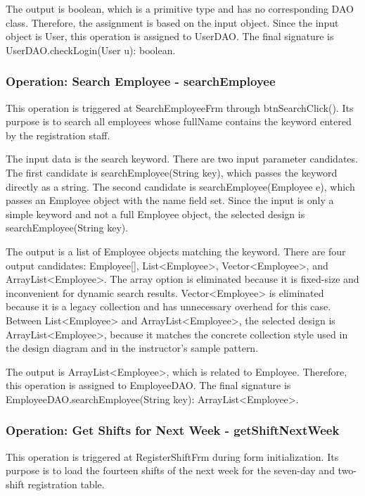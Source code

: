The output is boolean, which is a primitive type and has no corresponding DAO class. Therefore, the assignment is based on the input object. Since the input object is User, this operation is assigned to UserDAO. The final signature is UserDAO.checkLogin(User u): boolean.

\subsubsection{Operation: Search Employee - searchEmployee}

This operation is triggered at SearchEmployeeFrm through btnSearchClick(). Its purpose is to search all employees whose fullName contains the keyword entered by the registration staff.

The input data is the search keyword. There are two input parameter candidates. The first candidate is searchEmployee(String key), which passes the keyword directly as a string. The second candidate is searchEmployee(Employee e), which passes an Employee object with the name field set. Since the input is only a simple keyword and not a full Employee object, the selected design is searchEmployee(String key).

The output is a list of Employee objects matching the keyword. There are four output candidates: Employee[], List<Employee>, Vector<Employee>, and ArrayList<Employee>. The array option is eliminated because it is fixed-size and inconvenient for dynamic search results. Vector<Employee> is eliminated because it is a legacy collection and has unnecessary overhead for this case. Between List<Employee> and ArrayList<Employee>, the selected design is ArrayList<Employee>, because it matches the concrete collection style used in the design diagram and in the instructor's sample pattern.

The output is ArrayList<Employee>, which is related to Employee. Therefore, this operation is assigned to EmployeeDAO. The final signature is EmployeeDAO.searchEmployee(String key): ArrayList<Employee>.

\subsubsection{Operation: Get Shifts for Next Week - getShiftNextWeek}

This operation is triggered at RegisterShiftFrm during form initialization. Its purpose is to load the fourteen shifts of the next week for the seven-day and two-shift registration table.

